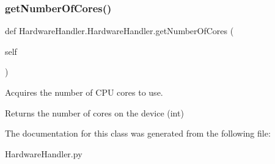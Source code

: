 \subsubsection{\texorpdfstring{get\+Number\+Of\+Cores()}{getNumberOfCores()}}
{\footnotesize\ttfamily def Hardware\+Handler.\+Hardware\+Handler.\+get\+Number\+Of\+Cores (\begin{DoxyParamCaption}\item[{}]{self }\end{DoxyParamCaption})}



Acquires the number of C\+PU cores to use. 

\begin{DoxyReturn}{Returns}
the number of cores on the device (int) 
\end{DoxyReturn}


The documentation for this class was generated from the following file\+:\begin{DoxyCompactItemize}
\item 
Hardware\+Handler.\+py\end{DoxyCompactItemize}
